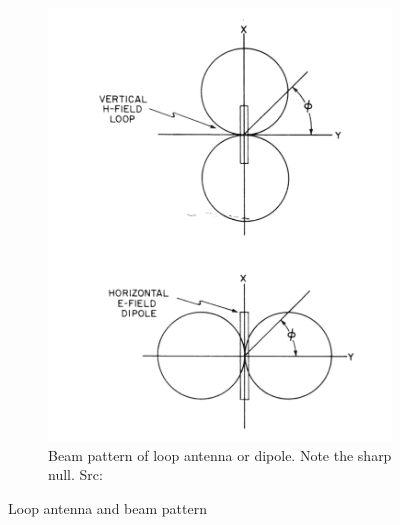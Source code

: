 \begin{figure}
\begin{subfigure}[b]{0.4\textwidth}
  \end{subfigure}
  ~
  \begin{subfigure}[b]{0.4\textwidth}
   \includegraphics[width=\textwidth]{./img/lit_review/loop_antenna_beam}
   \caption{Beam pattern of loop antenna or dipole. Note the sharp null. Src: \cite{jenkins1991smallaperture}}
  \end{subfigure}
  \caption{Loop antenna and beam pattern}
  \label{fig:lit_loop_antenna}
\end{figure}

